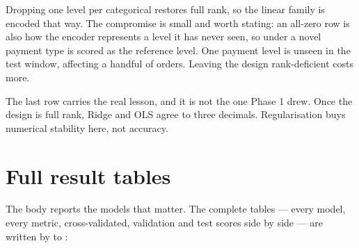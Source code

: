 Dropping one level per categorical restores full rank, so the linear family is
encoded that way. The compromise is small and worth stating: an all-zero row is
also how the encoder represents a level it has never seen, so under
 a novel payment type is scored as the reference level. One
payment level is unseen in the test window, affecting a handful of orders.
Leaving the design rank-deficient costs more.

The last row carries the real lesson, and it is not the one Phase 1 drew. Once
the design is full rank, Ridge and OLS agree to three decimals. Regularisation
buys numerical stability here, not accuracy.

\section{Full result tables}
\label{app:tables}

The body reports the models that matter. The complete tables --- every model,
every metric, cross-validated, validation and test scores side by side --- are
written by  to :

